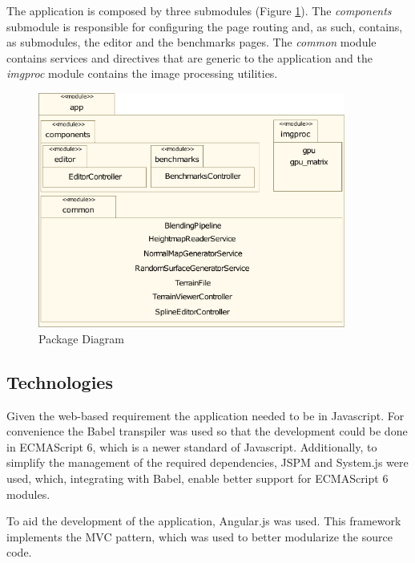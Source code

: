     The application is composed by three submodules (Figure \ref{fig:component_diagram}). The \textit{components} submodule is responsible for configuring the page routing and, as such, contains, as submodules, the editor and the benchmarks pages. The \textit{common} module contains services and directives that are generic to the application and the \textit{imgproc} module contains the image processing utilities.
    
    \begin{figure}[H]
      \begin{center}
      	 \includegraphics[width=0.9\textwidth]{images/diagrams/component-1.pdf}
      \end{center}
      \caption{Package Diagram}
      \label{fig:component_diagram}
    \end{figure}

    \subsection {Technologies}    
      
      Given the web-based requirement the application needed to be in Javascript. For convenience the Babel transpiler was used so that the development could be done in ECMAScript 6, which is a newer standard of Javascript. Additionally, to simplify the management of the required dependencies, JSPM and System.js were used, which, integrating with Babel, enable better support for ECMAScript 6 modules. 
      
      To aid the development of the application, Angular.js was used. This framework implements the MVC pattern, which was used to better modularize the source code.
      
